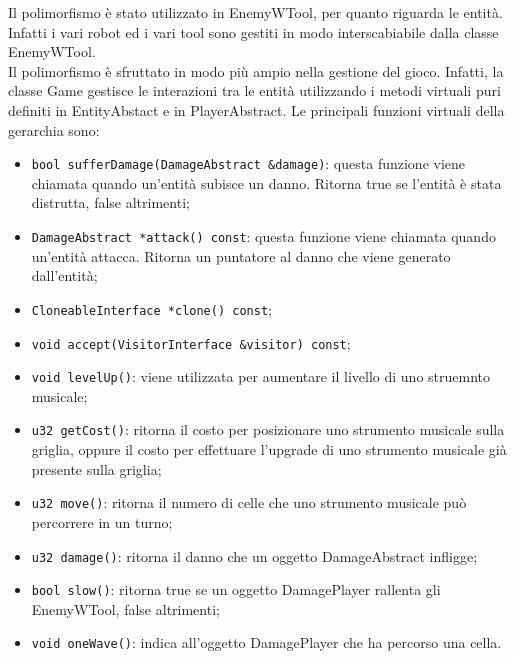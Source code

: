 \documentclass[11pt]{article}
\begin{document}
Il polimorfismo è stato utilizzato in EnemyWTool, per quanto riguarda le entità.
Infatti i vari robot ed i vari tool sono gestiti in modo interscabiabile dalla 
classe EnemyWTool.\\
Il polimorfismo è sfruttato in modo più ampio nella gestione del gioco. Infatti,
la classe Game gestisce le interazioni tra le entità utilizzando i metodi
virtuali puri definiti in EntityAbstact e in PlayerAbstract. 
Le principali funzioni virtuali della gerarchia sono:
\begin{itemize}
	\item \lstinline|bool sufferDamage(DamageAbstract &damage)|: questa funzione 
		viene chiamata quando un'entità subisce un danno. Ritorna true se 
		l'entità è stata distrutta, false altrimenti;

	\item \lstinline|DamageAbstract *attack() const|: questa funzione viene chiamata quando
		un'entità attacca. Ritorna un puntatore al danno che viene generato
		dall'entità;

	\item \lstinline|CloneableInterface *clone() const|;

	\item \lstinline|void accept(VisitorInterface &visitor) const|;


	\item \lstinline|void levelUp()|: viene utilizzata per aumentare il livello 
		di uno struemnto musicale;

	\item \lstinline|u32 getCost()|: ritorna il costo per posizionare uno strumento musicale
		sulla griglia, oppure il costo per effettuare l'upgrade di uno
		strumento musicale già presente sulla griglia;

	\item \lstinline|u32 move()|: ritorna il numero di celle che uno strumento musicale
		può percorrere in un turno;

	\item \lstinline|u32 damage()|: ritorna il danno che un oggetto DamageAbstract infligge;

	\item \lstinline|bool slow()|: ritorna true se un oggetto DamagePlayer rallenta gli
		EnemyWTool, false altrimenti;

	\item \lstinline|void oneWave()|: indica all'oggetto DamagePlayer che ha percorso una
		cella.
\end{itemize}
\end{document}
